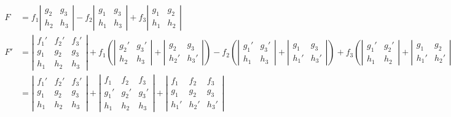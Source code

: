 \documentclass[twoside]{amsart}
\theoremstyle{plain}
\theoremstyle{definition}
\newcommand{\exercisehead}[1]
  {
   \noindent{\small\bf Exercise #1.}
   \smallskip}
\begin{document}
\exercisehead{7} 
\[
\begin{aligned}
  F & = f_1 \left| \begin{matrix} g_2 & g_3 \\ h_2 & h_3 \end{matrix} \right| - f_2 \left| \begin{matrix} g_1 & g_3 \\ h_1 & h_3 \end{matrix} \right| + f_3 \left| \begin{matrix} g_1 & g_2 \\ h_1 & h_2 \end{matrix} \right| \\
  F' &  = \left| \begin{matrix} f_1' & f_2' & f_3' \\ g_1 & g_2 & g_3 \\ h_1 & h_2 & h_3 \end{matrix} \right| + f_1 \left( \left| \begin{matrix} g_2' & g_3' \\ h_2 & h_3 \end{matrix} \right| + \left| \begin{matrix} g_2 & g_3 \\ h_2' & h_3' \end{matrix} \right| \right) - f_2 \left( \left| \begin{matrix} g_1' & g_3' \\ h_1 & h_3 \end{matrix} \right| + \left| \begin{matrix} g_1 & g_3 \\ h_1' & h_3' \end{matrix} \right| \right) + f_3 \left( \left| \begin{matrix} g_1' & g_2' \\ h_1 & h_2 \end{matrix} \right| + \left| \begin{matrix} g_1 & g_2 \\ h_1' & h_2' \end{matrix} \right| \right) = \\
  & = \left| \begin{matrix} f_1' & f_2' & f_3' \\ g_1 & g_2 & g_3 \\ h_1 & h_2 & h_3 \end{matrix} \right| + \left| \begin{matrix} f_1 & f_2 & f_3 \\ g_1' & g_2' & g_3' \\ h_1 & h_2 & h_3 \end{matrix} \right| + \left| \begin{matrix} f_1 & f_2 & f_3  \\ g_1 & g_2 & g_3 \\ h_1' & h_2' & h_3' \end{matrix} \right|
\end{aligned}
\]
\end{document}
